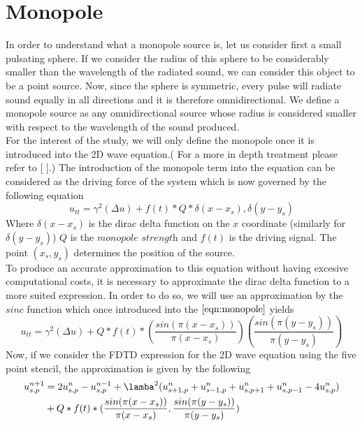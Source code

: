 \section{Monopole}
\label{chapter4:sec1}
In order to understand what a monopole source is, let us consider first a small pulsating sphere. If we consider the radius of this sphere to be considerably smaller than the wavelength of the radiated sound, we can consider this object to be a point source. Now, since the sphere is symmetric, every pulse will radiate sound equally in all directions and it is therefore omnidirectional. We define a monopole source as any omnidirectional source whose radius is considered smaller with respect to the wavelength of the sound produced.\\
For the interest of the study, we will only define the monopole once it is introduced into the 2D wave equation.( For a more in depth treatment please refer to [ ].) The introduction of the monopole term into the equation can be considered as the driving force of the system which is now governed by the following equation
\begin{equation}
\label{eqn:Monopole}
	u_{tt}=\gamma^{2}(\Delta u) + f(t)*Q*\delta(x-x_{s}),\delta(y-y_{s})
\end{equation}
Where $\delta(x-x_{s})$ is the dirac delta function on the $x$ coordinate (similarly for  $\delta(y-y_{s})$) $Q$ is the $\textit{monopole strength}$ and $f(t)$ is the driving signal. The point $(x_{s},y_{s})$ determines the position of the source.\\
To produce an accurate approximation to this equation without having excesive computational costs, it is necessary to approximate the dirac delta function to a more suited expression. In order to do so, we will use an approximation by the $sinc$ function which once introduced into the $\ref{eqn:monopole}$ yields
\begin{equation}
	u_{tt}=\gamma^{2}(\Delta u)  + Q*f(t)*(\frac{sin(\pi(x-x_{s}))}{\pi(x-x_{s})})(\frac{sin(\pi(y-y_{s}))}{\pi(y-y_{s})})
\end{equation}
Now, if we consider the FDTD expression for the 2D wave equation using the five point stencil, the approximation is given by the following 
\begin{equation}
\label{eqn:FD5mono}
	\begin{aligned}
	u^{n+1}_{s,p}&=2u^{n}_{s,p}-u^{n-1}_{s,p}+\lamba^{2}(u^{n}_{s+1,p}+u^{n}_{s-1,p}+u^{n}_{s,p+1}+u^{n}_{s,p-1}-4u^{n}_{s,p}) \\
			 &+ Q*f(t)*(\frac{sin(\pi(x-x_{s}))}{\pi(x-x_{s})},\frac{sin(\pi(y-y_{s}))}{\pi(y-y_{s})})
	\end{aligned}
\end{equation}

